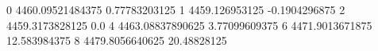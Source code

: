 0 4460.09521484375 0.77783203125
1 4459.126953125 -0.1904296875
2 4459.3173828125 0.0
4 4463.08837890625 3.77099609375
6 4471.9013671875 12.583984375
8 4479.8056640625 20.48828125
